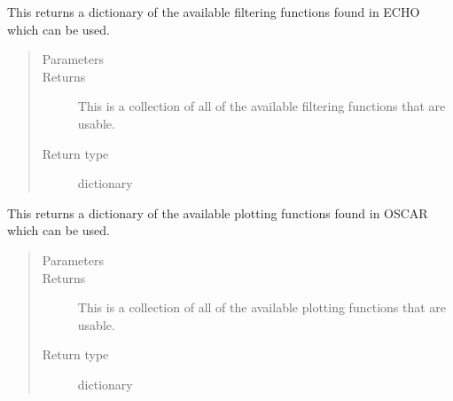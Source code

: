 \documentclass[letterpaper,10pt,english]{sphinxmanual}
\begin{document}
\begin{fulllineitems}
\label{\detokenize{python_docstrings/IfA_Smeargle.meta.meta_programming:IfA_Smeargle.meta.meta_programming.smeargle_avaliable_echo_filter_functions}}
This returns a dictionary of the available filtering functions found
in ECHO which can be used.
\begin{quote}\begin{description}
\item[{Parameters}] \leavevmode
{} \textendash{} 

\item[{Returns}] \leavevmode
{} \textendash{} This is a collection of all of the available filtering functions that
are usable.

\item[{Return type}] \leavevmode
dictionary

\end{description}\end{quote}

\end{fulllineitems}


\begin{fulllineitems}
\label{\detokenize{python_docstrings/IfA_Smeargle.meta.meta_programming:IfA_Smeargle.meta.meta_programming.smeargle_avaliable_oscar_plotting_functions}}
This returns a dictionary of the available plotting functions found
in OSCAR which can be used.
\begin{quote}\begin{description}
\item[{Parameters}] \leavevmode
{} \textendash{} 

\item[{Returns}] \leavevmode
{} \textendash{} This is a collection of all of the available plotting functions that
are usable.

\item[{Return type}] \leavevmode
dictionary

\end{description}\end{quote}

\end{fulllineitems}
\end{document}
